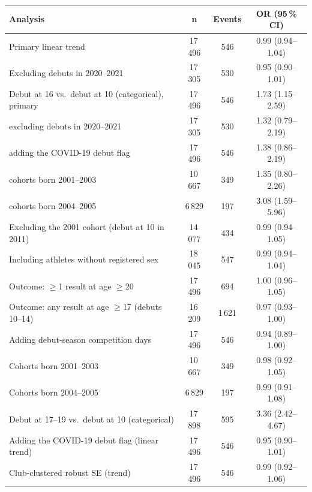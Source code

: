 \begin{tabular}{lccc}
\toprule
Analysis & n & Events & OR (95\,\% CI) \\
\midrule
Primary linear trend & 17\,496 & 546 & 0.99 (0.94--1.04) \\
Excluding debuts in 2020--2021 & 17\,305 & 530 & 0.95 (0.90--1.01) \\
Debut at 16 vs.\ debut at 10 (categorical), primary & 17\,496 & 546 & 1.73 (1.15--2.59) \\
\quad excluding debuts in 2020--2021 & 17\,305 & 530 & 1.32 (0.79--2.19) \\
\quad adding the COVID-19 debut flag & 17\,496 & 546 & 1.38 (0.86--2.19) \\
\quad cohorts born 2001--2003 & 10\,667 & 349 & 1.35 (0.80--2.26) \\
\quad cohorts born 2004--2005 & 6\,829 & 197 & 3.08 (1.59--5.96) \\
Excluding the 2001 cohort (debut at 10 in 2011) & 14\,077 & 434 & 0.99 (0.94--1.05) \\
Including athletes without registered sex & 18\,045 & 547 & 0.99 (0.94--1.04) \\
Outcome: $\geq$1 result at age $\geq$20 & 17\,496 & 694 & 1.00 (0.96--1.05) \\
Outcome: any result at age $\geq$17 (debuts 10--14) & 16\,209 & 1\,621 & 0.97 (0.93--1.00) \\
Adding debut-season competition days & 17\,496 & 546 & 0.94 (0.89--1.00) \\
Cohorts born 2001--2003 & 10\,667 & 349 & 0.98 (0.92--1.05) \\
Cohorts born 2004--2005 & 6\,829 & 197 & 0.99 (0.91--1.08) \\
Debut at 17--19 vs.\ debut at 10 (categorical) & 17\,898 & 595 & 3.36 (2.42--4.67) \\
Adding the COVID-19 debut flag (linear trend) & 17\,496 & 546 & 0.95 (0.90--1.01) \\
Club-clustered robust SE (trend) & 17\,496 & 546 & 0.99 (0.92--1.06) \\
\bottomrule
\end{tabular}
